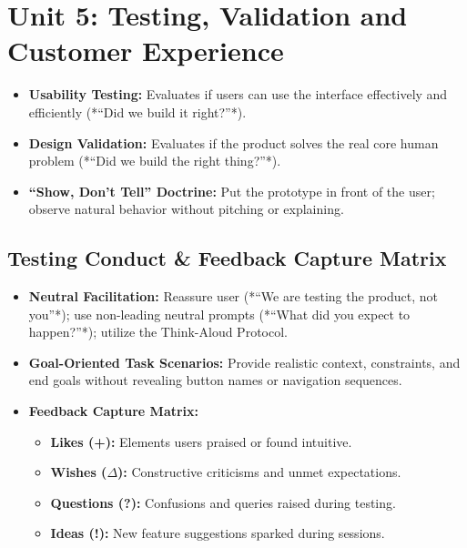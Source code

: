\chapter{Unit 5: Testing, Validation and Customer Experience}
\label{chap:unit5_rev}

\begin{revbox}
\begin{itemize}[leftmargin=1.2em, itemsep=2pt]
    \item \textbf{Usability Testing:} Evaluates if users can use the interface effectively and efficiently (*``Did we build it right?''*).
    \item \textbf{Design Validation:} Evaluates if the product solves the real core human problem (*``Did we build the right thing?''*).
    \item \textbf{``Show, Don't Tell'' Doctrine:} Put the prototype in front of the user; observe natural behavior without pitching or explaining.
\end{itemize}
\end{revbox}

\section{Testing Conduct \& Feedback Capture Matrix}

\begin{itemize}[leftmargin=1.2em, itemsep=3pt]
    \item \textbf{Neutral Facilitation:} Reassure user (*``We are testing the product, not you''*); use non-leading neutral prompts (*``What did you expect to happen?''*); utilize the Think-Aloud Protocol.
    \item \textbf{Goal-Oriented Task Scenarios:} Provide realistic context, constraints, and end goals without revealing button names or navigation sequences.
    \item \textbf{Feedback Capture Matrix:}
    \begin{itemize}
        \item \textbf{Likes (+):} Elements users praised or found intuitive.
        \item \textbf{Wishes ($\Delta$):} Constructive criticisms and unmet expectations.
        \item \textbf{Questions (?):} Confusions and queries raised during testing.
        \item \textbf{Ideas (!):} New feature suggestions sparked during sessions.
    \end{itemize}
\end{itemize}

